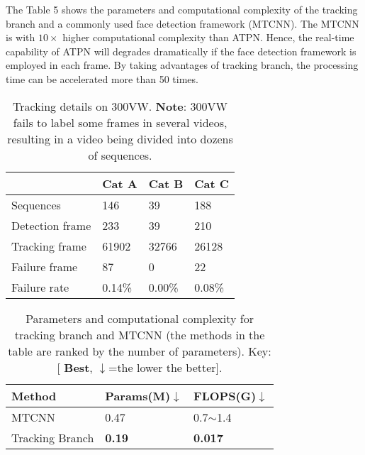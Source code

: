 \documentclass[3p,twocolumn, round, sort & compress]{elsarticle}
\begin{document}
The Table 5 shows the parameters and computational complexity of the tracking branch and a commonly used face detection framework (MTCNN). The MTCNN is with $10\times$ higher computational complexity than ATPN. Hence, the real-time capability of ATPN will degrades dramatically if the face detection framework is employed in each frame. By taking advantages of tracking branch, the processing time can be accelerated more than 50 times.


\begin{table}[t!]
	\centering
	\begin{tabular}{|l|l|l|l|}
		\hline
		& Cat A & Cat B & Cat C \\ \hline
		Sequences       & 146        & 39         & 188        \\ \hline
		Detection frame & 233        & 39         & 210        \\ \hline
		Tracking frame  & 61902      & 32766      & 26128      \\ \hline
		Failure frame   & 87         & 0          & 22         \\ \hline
		Failure rate    & 0.14\%     & 0.00\%     & 0.08\%     \\ \hline
	\end{tabular}
	\caption{Tracking details on 300VW. \textbf{Note}: 300VW fails to label some frames in several videos, resulting in a video being divided into dozens of sequences.}
	\label{Tabal4}
\end{table}

\begin{table}[t!]
	\centering
	\begin{tabular}{m{3.0cm}<{\centering}m{1.6cm}<{\centering}m{1.6cm}<{\centering}}
		\hline
		Method          & Params(M)$\downarrow$ & FLOPS(G)$\downarrow$ \\ \hline
		MTCNN \citep{MTCNN}   & 0.47  & 0.7$ \sim $1.4  \\ 
		Tracking Branch & {\color{red} \textbf{0.19}} & {\color{red} \textbf{0.017}}    \\ \hline
	\end{tabular}
	\caption{Parameters and computational complexity for tracking branch and MTCNN (the methods in the table are ranked by the number of parameters). Key: [{\color{red} \textbf{Best}}, $\downarrow$=the lower the better].}
	\label{Tabal5}
\end{table}
\end{document}
